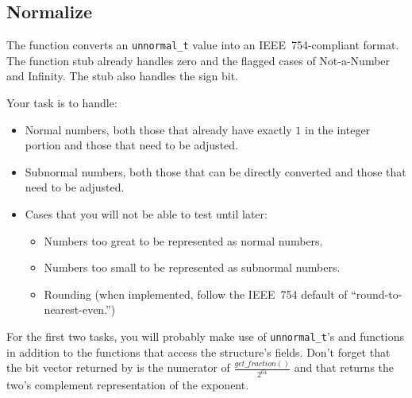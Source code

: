 \subsection*{Normalize}

The  function converts an \lstinline{unnormal_t} value into an IEEE~754-compliant format.
The function stub already handles zero and the flagged cases of Not-a-Number and Infinity.
The stub also handles the sign bit.

Your task is to handle:
\begin{itemize}
    \item Normal numbers, both those that already have exactly $1$ in the integer portion and those that need to be adjusted.
    \item Subnormal numbers, both those that can be directly converted and those that need to be adjusted.
    \item Cases that you will not be able to test until later:
    \begin{itemize}
        \item Numbers too great to be represented as normal numbers.
        \item Numbers too small to be represented as subnormal numbers.
        \item Rounding (when implemented, follow the IEEE~754 default of ``round-to-nearest-even.'')
    \end{itemize}
\end{itemize}

For the first two tasks, you will probably make use of \lstinline{unnormal_t}'s  and  functions in addition to the functions that access the structure's fields.
Don't forget that the bit vector returned by  is the numerator of $\frac{get\_fraction()}{2^{64}}$ and that  returns the two's complement representation of the exponent.

